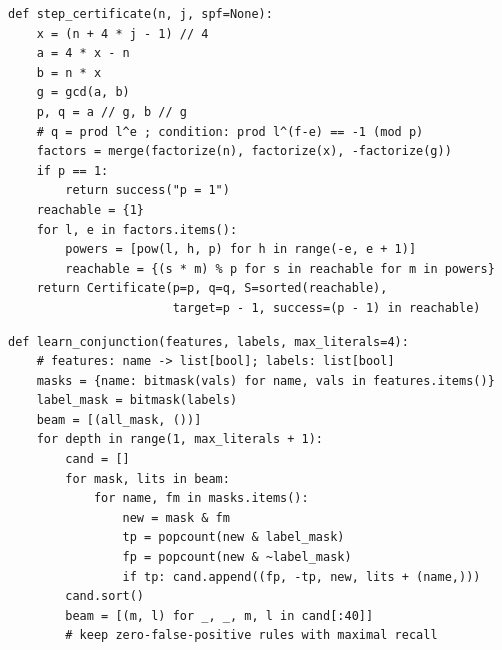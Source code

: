 \documentclass[11pt,a4paper]{ctexart}
\theoremstyle{definition}
\theoremstyle{remark}
\begin{document}
\begin{lstlisting}[caption={除子证书（\texttt{domain.py} 节选）}]
def step_certificate(n, j, spf=None):
    x = (n + 4 * j - 1) // 4
    a = 4 * x - n
    b = n * x
    g = gcd(a, b)
    p, q = a // g, b // g
    # q = prod l^e ; condition: prod l^(f-e) == -1 (mod p)
    factors = merge(factorize(n), factorize(x), -factorize(g))
    if p == 1:
        return success("p = 1")
    reachable = {1}
    for l, e in factors.items():
        powers = [pow(l, h, p) for h in range(-e, e + 1)]
        reachable = {(s * m) % p for s in reachable for m in powers}
    return Certificate(p=p, q=q, S=sorted(reachable),
                       target=p - 1, success=(p - 1) in reachable)
\end{lstlisting}

\begin{lstlisting}[caption={通用规则学习（\texttt{rules.py} 节选）}]
def learn_conjunction(features, labels, max_literals=4):
    # features: name -> list[bool]; labels: list[bool]
    masks = {name: bitmask(vals) for name, vals in features.items()}
    label_mask = bitmask(labels)
    beam = [(all_mask, ())]
    for depth in range(1, max_literals + 1):
        cand = []
        for mask, lits in beam:
            for name, fm in masks.items():
                new = mask & fm
                tp = popcount(new & label_mask)
                fp = popcount(new & ~label_mask)
                if tp: cand.append((fp, -tp, new, lits + (name,)))
        cand.sort()
        beam = [(m, l) for _, _, m, l in cand[:40]]
        # keep zero-false-positive rules with maximal recall
\end{lstlisting}
\end{document}
